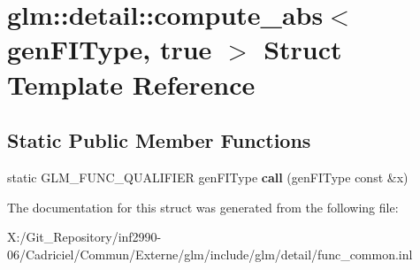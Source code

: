 \hypertarget{structglm_1_1detail_1_1compute__abs_3_01gen_f_i_type_00_01true_01_4}{\section{glm\-:\-:detail\-:\-:compute\-\_\-abs$<$ gen\-F\-I\-Type, true $>$ Struct Template Reference}
\label{structglm_1_1detail_1_1compute__abs_3_01gen_f_i_type_00_01true_01_4}
}
\subsection*{Static Public Member Functions}
\begin{DoxyCompactItemize}
\item 
\hypertarget{structglm_1_1detail_1_1compute__abs_3_01gen_f_i_type_00_01true_01_4_a13dee7b421d52969e40d8cdef020d0be}{static G\-L\-M\-\_\-\-F\-U\-N\-C\-\_\-\-Q\-U\-A\-L\-I\-F\-I\-E\-R gen\-F\-I\-Type {\bfseries call} (gen\-F\-I\-Type const \&x)}\label{structglm_1_1detail_1_1compute__abs_3_01gen_f_i_type_00_01true_01_4_a13dee7b421d52969e40d8cdef020d0be}

\end{DoxyCompactItemize}


The documentation for this struct was generated from the following file\-:\begin{DoxyCompactItemize}
\item 
X\-:/\-Git\-\_\-\-Repository/inf2990-\/06/\-Cadriciel/\-Commun/\-Externe/glm/include/glm/detail/func\-\_\-common.\-inl\end{DoxyCompactItemize}
